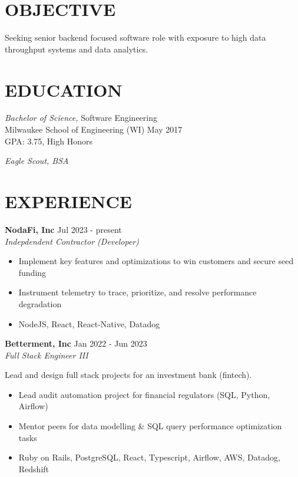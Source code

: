 \documentclass[line,margin]{res}
\begin{document}

\address{austin.dev@protonmail.com | (414) 334-4061 | github: euclideansphere}

\begin{resume}

\section{OBJECTIVE}
Seeking senior backend focused software role with exposure to high data throughput systems and data analytics.

\section{EDUCATION}
{\sl Bachelor of Science,} Software Engineering \\
Milwaukee School of Engineering (WI) \hfill May 2017 \\
GPA: 3.75, High Honors

{\sl Eagle Scout, BSA}

\section{EXPERIENCE}

\textbf{NodaFi, Inc} \hfill Jul 2023 - present \\
{\sl Indepdendent Contractor (Developer)}

\begin{itemize}
\item Implement key features and optimizations to win customers and secure seed funding
\item Instrument telemetry to trace, prioritize, and resolve performance degradation
\item NodeJS, React, React-Native, Datadog
\end{itemize}

\textbf{Betterment, Inc} \hfill Jan 2022 - Jun 2023 \\
{\sl Full Stack Engineer III}

Lead and design full stack projects for an investment bank (fintech).

\begin{itemize}
\item Lead audit automation project for financial regulators (SQL, Python, Airflow)
\item Mentor peers for data modelling \& SQL query performance optimization tasks
\item Ruby on Rails, PostgreSQL, React, Typescript, Airflow, AWS, Datadog, Redshift
\end{itemize}


\end{resume}
\end{document}
